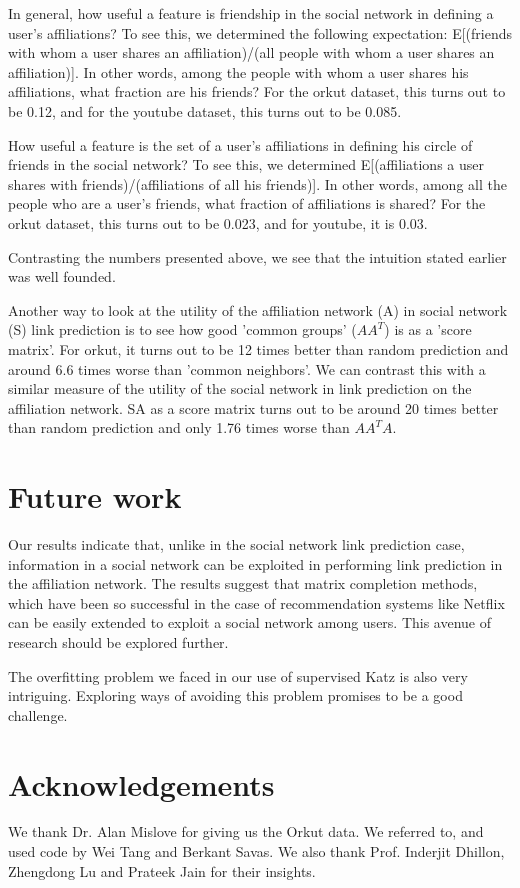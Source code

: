 \documentclass{report}
\begin{document}
In general, how useful a feature is friendship in the social network in defining a user's affiliations? To see this, we determined the following expectation: E[(friends with whom a user shares an affiliation)/(all people with whom a user shares an affiliation)]. In other words, among the people with whom a user shares his affiliations, what fraction are his friends? For the orkut dataset, this turns out to be 0.12, and for the youtube dataset, this turns out to be 0.085.

How useful a feature is the set of a user's affiliations in defining his circle of friends in the social network? To see this, we determined E[(affiliations a user shares with friends)/(affiliations of all his friends)]. In other words, among all the people who are a user's friends, what fraction of affiliations is shared? For the orkut dataset, this turns out to be 0.023, and for youtube, it is 0.03.

Contrasting the numbers presented above, we see that the intuition stated earlier was well founded.

Another way to look at the utility of the affiliation network (A) in social network (S) link prediction is to see how good 'common groups' ($AA^{T}$) is as a 'score matrix'. For orkut, it turns out to be 12 times better than random prediction and around 6.6 times worse than 'common neighbors'. We can contrast this with a similar measure of the utility of the social network in link prediction on the affiliation network. SA as a score matrix turns out to be around 20 times better than random prediction and only 1.76 times worse than $AA^{T}A$.


\section{Future work}
Our results indicate that, unlike in the social network link prediction case, information in a social network can be exploited in performing link prediction in the affiliation network. The results suggest that matrix completion methods, which have been so successful in the case of recommendation systems like Netflix can be easily extended to exploit a social network among users. This avenue of research should be explored further.

The overfitting problem we faced in our use of supervised Katz is also very intriguing. Exploring ways of avoiding this problem promises to be a good challenge.

\section{Acknowledgements}
We thank Dr. Alan Mislove \cite{mislove-2007-socialnetworks} for giving us the Orkut data. We referred to, and used code by Wei Tang and Berkant Savas. We also thank Prof. Inderjit Dhillon, Zhengdong Lu and Prateek Jain for their insights.



\end{document}
